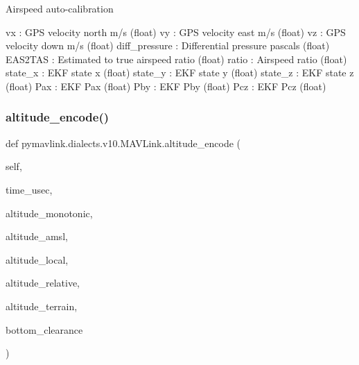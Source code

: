 \begin{DoxyVerb}Airspeed auto-calibration

vx                        : GPS velocity north m/s (float)
vy                        : GPS velocity east m/s (float)
vz                        : GPS velocity down m/s (float)
diff_pressure             : Differential pressure pascals (float)
EAS2TAS                   : Estimated to true airspeed ratio (float)
ratio                     : Airspeed ratio (float)
state_x                   : EKF state x (float)
state_y                   : EKF state y (float)
state_z                   : EKF state z (float)
Pax                       : EKF Pax (float)
Pby                       : EKF Pby (float)
Pcz                       : EKF Pcz (float)\end{DoxyVerb}
 \mbox{\label{classpymavlink_1_1dialects_1_1v10_1_1MAVLink_a250fe68fab98e6db77206ac42e53f400}} 
\subsubsection{\texorpdfstring{altitude\+\_\+encode()}{altitude\_encode()}}
{\footnotesize\ttfamily def pymavlink.\+dialects.\+v10.\+M\+A\+V\+Link.\+altitude\+\_\+encode (\begin{DoxyParamCaption}\item[{}]{self,  }\item[{}]{time\+\_\+usec,  }\item[{}]{altitude\+\_\+monotonic,  }\item[{}]{altitude\+\_\+amsl,  }\item[{}]{altitude\+\_\+local,  }\item[{}]{altitude\+\_\+relative,  }\item[{}]{altitude\+\_\+terrain,  }\item[{}]{bottom\+\_\+clearance }\end{DoxyParamCaption})}

